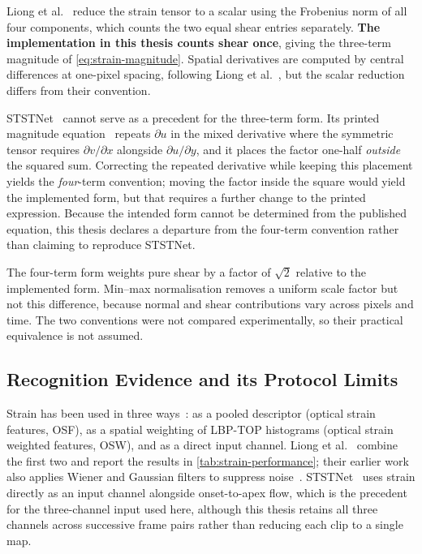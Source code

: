 Liong et al.~\cite{liong2014a,liong2014b,liong2016} reduce the strain tensor to a scalar using the Frobenius norm of all four components, which counts the two equal shear entries separately. \textbf{The implementation in this thesis counts shear once}, giving the three-term magnitude of \eqref{eq:strain-magnitude}. Spatial derivatives are computed by central differences at one-pixel spacing, following Liong et al.~\cite{liong2014a}, but the scalar reduction differs from their convention.

STSTNet~\cite{liong2019b} cannot serve as a precedent for the three-term form. Its printed magnitude equation~\cite{liong2019b} repeats $\partial u$ in the mixed derivative where the symmetric tensor requires $\partial v/\partial x$ alongside $\partial u/\partial y$, and it places the factor one-half \emph{outside} the squared sum. Correcting the repeated derivative while keeping this placement yields the \textit{four}-term convention; moving the factor inside the square would yield the implemented form, but that requires a further change to the printed expression. Because the intended form cannot be determined from the published equation, this thesis declares a departure from the four-term convention rather than claiming to reproduce STSTNet.

The four-term form weights pure shear by a factor of $\sqrt{2}$ relative to the implemented form. Min--max normalisation removes a uniform scale factor but not this difference, because normal and shear contributions vary across pixels and time. The two conventions were not compared experimentally, so their practical equivalence is not assumed.

\subsection{Recognition Evidence and its Protocol Limits}
\label{sec:strain-evidence}

Strain has been used in three ways~\cite{liong2014a,liong2014b,liong2016,liong2019b}: as a pooled descriptor (optical strain features, OSF), as a spatial weighting of LBP-TOP histograms (optical strain weighted features, OSW), and as a direct input channel. Liong et al.~\cite{liong2016} combine the first two and report the results in \autoref{tab:strain-performance}; their earlier work also applies Wiener and Gaussian filters to suppress noise~\cite{liong2014a}. STSTNet~\cite{liong2019b} uses strain directly as an input channel alongside onset-to-apex flow, which is the precedent for the three-channel input used here, although this thesis retains all three channels across successive frame pairs rather than reducing each clip to a single map.

